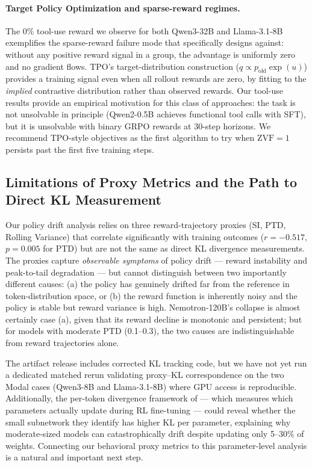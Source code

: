 \documentclass{article}
\begin{document}
\paragraph{Target Policy Optimization and sparse-reward regimes.}
The 0\% tool-use reward we observe for both Qwen3-32B and Llama-3.1-8B
exemplifies the sparse-reward failure mode that \citet{kaddour2026tpo}
specifically designs against: without any positive reward signal in a group,
the advantage is uniformly zero and no gradient flows.
TPO's target-distribution construction ($q \propto p_\text{old} \exp(u)$)
provides a training signal even when all rollout rewards are zero, by fitting
to the \emph{implied} contrastive distribution rather than observed rewards.
Our tool-use results provide an empirical motivation for this class of
approaches: the task is not unsolvable in principle (Qwen2-0.5B achieves
functional tool calls with SFT), but it is unsolvable with binary GRPO
rewards at 30-step horizons.
We recommend TPO-style objectives as the first algorithm to try when
$\text{ZVF} = 1$ persists past the first five training steps.

\subsection{Limitations of Proxy Metrics and the Path to Direct KL Measurement}
\label{sec:discuss_kl}

Our policy drift analysis relies on three reward-trajectory proxies (SI, PTD,
Rolling Variance) that correlate significantly with training outcomes
($r = -0.517$, $p = 0.005$ for PTD) but are not the same as direct KL
divergence measurements.
The proxies capture \emph{observable symptoms} of policy drift --- reward
instability and peak-to-tail degradation --- but cannot distinguish between
two importantly different causes: (a) the policy has genuinely drifted far from
the reference in token-distribution space, or (b) the reward function is
inherently noisy and the policy is stable but reward variance is high.
Nemotron-120B's collapse is almost certainly case (a), given that its reward
decline is monotonic and persistent; but for models with moderate PTD (0.1--0.3),
the two causes are indistinguishable from reward trajectories alone.

The artifact release includes corrected KL tracking code, but we have not yet
run a dedicated matched rerun validating proxy--KL correspondence on the two
Modal cases (Qwen3-8B and Llama-3.1-8B) where GPU access is reproducible.
Additionally, the per-token divergence framework of \citet{liu2025rlsubnetworks}
--- which measures which parameters actually update during RL fine-tuning ---
could reveal whether the small subnetwork they identify has higher KL per
parameter, explaining why moderate-sized models can catastrophically drift
despite updating only 5--30\% of weights.
Connecting our behavioral proxy metrics to this parameter-level analysis is a
natural and important next step.
\end{document}

